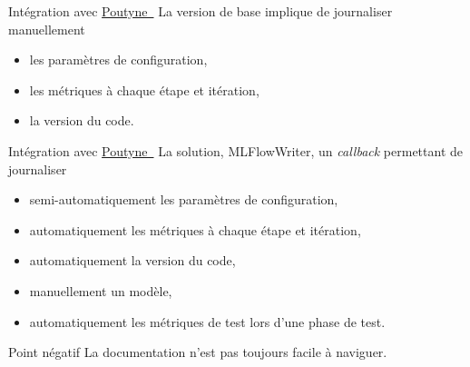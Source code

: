 \documentclass[aspectratio=169,10pt,xcolor=x11names,english,french]{beamer}
\newcommand{\link}[2]{\href{#1}{#2~{\smaller\faExternalLink*}}}
\newcommand{\guillemet}[1]{\guillemotleft #1 \guillemotright}
\begin{document}
	\begin{frame}{Intégration avec \link{https://poutyne.org/}{Poutyne}}
		La version de \guillemet{base} implique de journaliser manuellement %
		\begin{itemize}
			\item les paramètres de configuration,
			\item les métriques à chaque étape et itération,
			\item la version du code.
		\end{itemize}
	\end{frame}

	\begin{frame}{Intégration avec \link{https://poutyne.org/}{Poutyne}} %
		La solution, \color{bleu}MLFlowWriter\color{couleurpolice}, un \textit{callback} permettant de journaliser 
		\begin{itemize}
			\item semi-automatiquement les paramètres de configuration,
			\item automatiquement les métriques à chaque étape et itération,
			\item automatiquement la version du code,
			\item manuellement un modèle,
			\item automatiquement les métriques de test lors d'une phase de test.
		\end{itemize}
	\end{frame}

	\begin{frame}{Point négatif}
		La documentation n'est pas toujours facile à naviguer.
	\end{frame}

		
\end{document}
